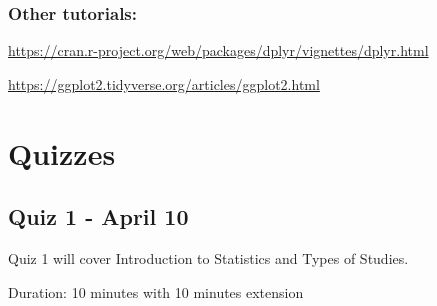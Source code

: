 \documentclass[
  letterpaper,
  DIV=11,
  numbers=noendperiod]{scrreprt}
\begin{document}
\section{Other tutorials:}\label{other-tutorials}

\url{https://cran.r-project.org/web/packages/dplyr/vignettes/dplyr.html}

\url{https://ggplot2.tidyverse.org/articles/ggplot2.html}

\part{Quizzes}

\chapter{Quiz 1 - April 10}\label{quiz-1---april-10}

Quiz 1 will cover Introduction to Statistics and Types of Studies.

Duration: 10 minutes with 10 minutes extension
\end{document}
